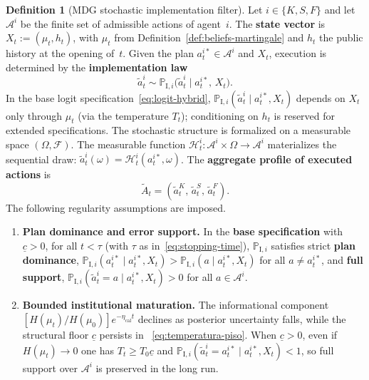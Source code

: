 \documentclass[12pt]{article}
\numberwithin{equation}{section}
\numberwithin{table}{section}
\theoremstyle{definition}
\newtheorem{definition}[theorem]{Definition}
\newcommand{\ProbI}[1]{\mathbb{P}_{\mathrm{I},#1}}
\begin{document}

\begin{definition}[MDG stochastic implementation filter]
\label{def:mano-dios-filtro}
Let $i\in\{K,S,F\}$ and let $\mathcal{A}^i$ be the finite set of admissible
actions of agent~$i$. The \textbf{state vector} is
$X_t:=(\mu_t,h_t)$, with $\mu_t$ from
Definition~\ref{def:beliefs-martingale} and $h_t$ the public history at the
opening of~$t$. Given the plan $a_t^{i\ast}\in\mathcal{A}^i$ and $X_t$,
execution is determined by the \textbf{implementation law}
\[
\tilde{a}_t^i \sim \ProbI{i}\bigl(\tilde{a}_t^i \mid a_t^{i\ast},\,X_t\bigr).
\]
In the base logit specification~\eqref{eq:logit-hybrid},
$\ProbI{i}(\tilde{a}_t^i\mid a_t^{i\ast},X_t)$ depends on $X_t$ only through $\mu_t$
(via the temperature $T_t$); conditioning on $h_t$ is reserved for extended
specifications. The stochastic structure is formalized on a measurable space
$(\Omega,\mathcal{F})$. The measurable function
$\mathcal{H}_t^i:\mathcal{A}^i\times\Omega\to\mathcal{A}^i$ materializes the
sequential draw: $\tilde{a}_t^i(\omega)=\mathcal{H}_t^i(a_t^{i\ast},\omega)$.
The \textbf{aggregate profile of executed actions} is
\begin{equation}
\label{eq:tilde-A-t}
\tilde{A}_t = (\tilde{a}_t^K,\,\tilde{a}_t^S,\,\tilde{a}_t^F).
\end{equation}
The following regularity assumptions are imposed.
\begin{enumerate}
  \item[\textup{(i)}] \textbf{Plan dominance and error support.}
  In the \textbf{base specification} with $\underline{c}>0$, for all
  $t<\tau$ (with $\tau$ as in~\eqref{eq:stopping-time}),
  $\ProbI{i}$ satisfies strict \textbf{plan dominance},
  $\ProbI{i}(a_t^{i\ast}\mid a_t^{i\ast},X_t)>\ProbI{i}(a\mid a_t^{i\ast},X_t)$
  for all $a\neq a_t^{i\ast}$, and \textbf{full support},
  $\ProbI{i}(\tilde{a}_t^i=a\mid a_t^{i\ast},X_t)>0$ for all
  $a\in\mathcal{A}^i$.
  \item[\textup{(ii)}] \textbf{Bounded institutional maturation.}
  The informational component
  $[H(\mu_t)/H(\mu_0)]e^{-\eta_{\mathrm{cal}}t}$ declines as posterior
  uncertainty falls, while the structural floor $\underline{c}$ persists in
  ~\eqref{eq:temperatura-piso}. When $\underline{c}>0$, even if
  $H(\mu_t)\to 0$ one has $T_t\ge T_0\underline{c}$ and
  $\ProbI{i}(\tilde{a}_t^i=a_t^{i\ast}\mid a_t^{i\ast},X_t)<1$, so full
  support over $\mathcal{A}^i$ is preserved in the long run.

\end{enumerate}
\end{definition}
\end{document}
